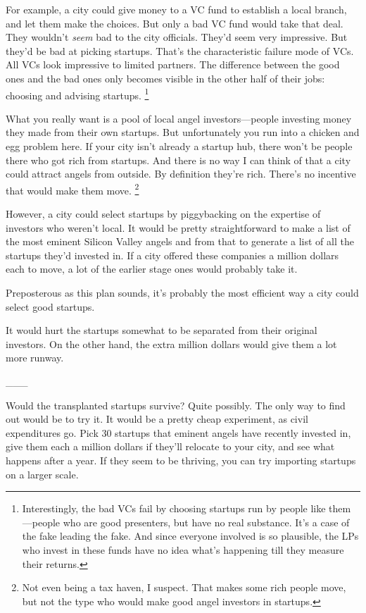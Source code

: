 \documentclass[12pt]{book}
\begin{document}
For example, a city could give money to a VC fund to establish a local
branch, and let them make the choices. But only a bad VC fund would take
that deal. They wouldn't \emph{seem} bad to the city officials. They'd
seem very impressive. But they'd be bad at picking startups. That's the
characteristic failure mode of VCs. All VCs look impressive to limited
partners. The difference between the good ones and the bad ones only
becomes visible in the other half of their jobs: choosing and advising
startups. \footnote{Interestingly, the bad VCs fail by choosing startups run by
people like them---people who are good presenters, but have no real
substance. It's a case of the fake leading the fake. And since everyone
involved is so plausible, the LPs who invest in these funds have no idea
what's happening till they measure their returns.}

What you really want is a pool of local angel investors---people
investing money they made from their own startups. But unfortunately you
run into a chicken and egg problem here. If your city isn't already a
startup hub, there won't be people there who got rich from startups. And
there is no way I can think of that a city could attract angels from
outside. By definition they're rich. There's no incentive that would
make them move. \footnote{Not even being a tax haven, I suspect. That makes some rich
people move, but not the type who would make good angel investors in
startups.}

However, a city could select startups by piggybacking on the expertise
of investors who weren't local. It would be pretty straightforward to
make a list of the most eminent Silicon Valley angels and from that to
generate a list of all the startups they'd invested in. If a city
offered these companies a million dollars each to move, a lot of the
earlier stage ones would probably take it.

Preposterous as this plan sounds, it's probably the most efficient way a
city could select good startups.

It would hurt the startups somewhat to be separated from their original
investors. On the other hand, the extra million dollars would give them
a lot more runway.

\_\_\_

Would the transplanted startups survive? Quite possibly. The only way to
find out would be to try it. It would be a pretty cheap experiment, as
civil expenditures go. Pick 30 startups that eminent angels have
recently invested in, give them each a million dollars if they'll
relocate to your city, and see what happens after a year. If they seem
to be thriving, you can try importing startups on a larger scale.
\end{document}
